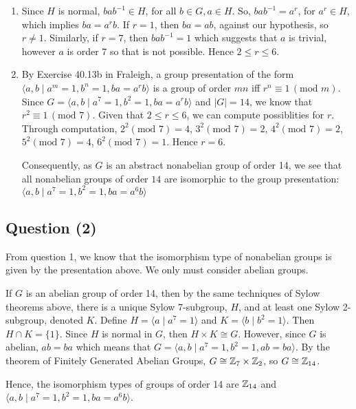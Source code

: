 \documentclass{article}
\begin{document}
\begin{enumerate}[label=\alph*)]
	\item Since $H$ is normal, $bab^{-1} \in H$, for all $b \in G, a \in H$. So, $bab^{-1} = a^r$, for $a^r \in H$, which implies $ba = a^rb$. If $r = 1$, then $ba = ab$, against our hypothesis, so $r \neq 1$. Similarly, if $r = 7$, then $bab^{-1} = 1$ which suggests that $a$ is trivial, however $a$ is order 7 so that is not possible. Hence $2 \leq r \leq 6$. 
	\item By Exercise 40.13b in Fraleigh, a group presentation of the form $\langle a, b \mid a^m = 1, b^n = 1, ba = a^rb\rangle$ is a group of order $mn$ iff $r^n \equiv 1 \, (\text{mod } m)$. Since $G = \langle a, b \mid a^7 = 1, b^2 = 1, ba = a^rb \rangle$ and $|G| = 14$, we know that $r^2 \equiv 1 \, (\text{mod } 7)$. Given that $2 \leq r \leq 6$, we can compute possiblities for $r$. Through computation, $2^2 (\text{mod 7}) = 4$, $3^2 (\text{mod 7}) = 2$, $4^2 (\text{mod 7}) = 2$, $5^2 (\text{mod 7}) = 4$, $6^2 (\text{mod 7}) = 1$. Hence $r = 6$.
	
	Consequently, as $G$ is an abstract nonabelian group of order 14, we see that all nonabelian groups of order $14$ are isomorphic to the group presentation: $\langle a, b \mid a^7 = 1, b^2 = 1, ba = a^6b\rangle$
\end{enumerate}

\begin{center}
	\section*{Question (2)}
\end{center}

\begin{flushleft}
	From question 1, we know that the isomorphism type of nonabelian groups is given by the presentation above. We only must consider abelian groups. \newline 
	
	If $G$ is an abelian group of order 14, then by the same techniques of Sylow theorems above, there is a unique Sylow 7-subgroup, $H$, and at least one Sylow 2-subgroup, denoted $K$. Define $H = \langle a \mid a^7 = 1 \rangle$ and $K = \langle b \mid b^2 = 1 \rangle$. Then $H \cap K = \{1\}.$ Since $H$ is normal in $G$, then $H \times K \cong G$. However, since $G$ is abelian, $ab = ba$ which means that $G = \langle a, b \mid a^7 = 1, b^2 = 1, ab = ba \rangle$. By the theorem of Finitely Generated Abelian Groups, $G \cong \mathbb{Z}_7 \times \mathbb{Z}_2$, so $G \cong \mathbb{Z}_{14}$. 
	
	Hence, the isomorphism types of groups of order 14 are $\mathbb{Z}_{14}$ and $\langle a, b \mid a^7 = 1, b^2 = 1, ba = a^6b\rangle$.
\end{flushleft}
\end{document}
